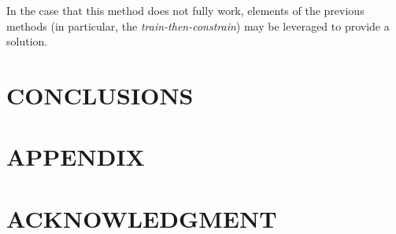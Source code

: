 \documentclass[letterpaper, 10 pt, conference]{ieeeconf}  %
\begin{document}
In the case that this method does not fully work, elements of the previous methods (in particular, the \textit{train-then-constrain}) may be leveraged to provide a solution. 

\section{CONCLUSIONS}

\addtolength{\textheight}{-12cm}   %







\section*{APPENDIX}

\section*{ACKNOWLEDGMENT}



\end{document}
